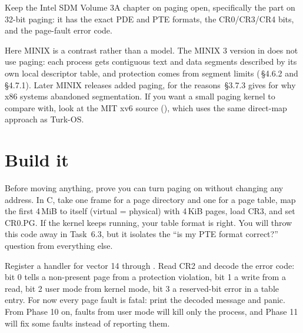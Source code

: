 \documentclass[11pt,a4paper]{article}
\begin{document}
Keep the Intel SDM Volume 3A chapter on paging open, specifically the part on 32-bit paging: it has the exact PDE
and PTE formats, the CR0/CR3/CR4 bits, and the page-fault error code.

\begin{minixbox}
Here MINIX is a contrast rather than a model. The MINIX 3 version in \OSDI does not use paging: each process gets
contiguous text and data segments described by its own local descriptor table, and protection comes from segment
limits (\OSDI\,\S4.6.2 and \S4.7.1). Later MINIX releases added paging, for the reasons \MOS\,\S3.7.3 gives for
why x86 systems abandoned segmentation. If you want a small paging kernel to compare with, look at the MIT xv6
source (), which uses the same direct-map approach as Turk-OS.
\end{minixbox}

\section{Build it}

Before moving anything, prove you can turn paging on without changing any address. In C, take one frame for a page
directory and one for a page table, map the first 4\,MiB to itself (virtual = physical) with 4\,KiB pages, load CR3,
and set CR0.PG. If the kernel keeps running, your table format is right. You will throw this code away in Task~6.3,
but it isolates the ``is my PTE format correct?'' question from everything else.


Register a handler for vector 14 through . Read CR2 and decode the error code:
bit 0 tells a non-present page from a protection violation, bit 1 a write from a read, bit 2 user mode from kernel
mode, bit 3 a reserved-bit error in a table entry. For now every page fault is fatal: print the decoded message and
panic. From Phase 10 on, faults from user mode will kill only the process, and Phase 11 will fix some faults instead
of reporting them.
\end{document}
